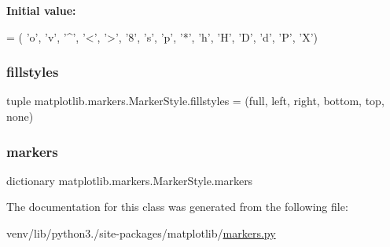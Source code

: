 {\bfseries Initial value\+:}
\begin{DoxyCode}
=  (
        \textcolor{stringliteral}{'o'}, \textcolor{stringliteral}{'v'}, \textcolor{stringliteral}{'^'}, \textcolor{stringliteral}{'<'}, \textcolor{stringliteral}{'>'}, \textcolor{stringliteral}{'8'}, \textcolor{stringliteral}{'s'}, \textcolor{stringliteral}{'p'}, \textcolor{stringliteral}{'*'}, \textcolor{stringliteral}{'h'}, \textcolor{stringliteral}{'H'}, \textcolor{stringliteral}{'D'}, \textcolor{stringliteral}{'d'},
        \textcolor{stringliteral}{'P'}, \textcolor{stringliteral}{'X'})
\end{DoxyCode}
\mbox{\label{classmatplotlib_1_1markers_1_1MarkerStyle_afdd2d6b5d2416a69e548989c2b518da4}} 
\subsubsection{\texorpdfstring{fillstyles}{fillstyles}}
{\footnotesize\ttfamily tuple matplotlib.\+markers.\+Marker\+Style.\+fillstyles = (\textquotesingle{}full\textquotesingle{}, \textquotesingle{}left\textquotesingle{}, \textquotesingle{}right\textquotesingle{}, \textquotesingle{}bottom\textquotesingle{}, \textquotesingle{}top\textquotesingle{}, \textquotesingle{}none\textquotesingle{})\hspace{0.3cm}{\ttfamily [static]}}

\mbox{\label{classmatplotlib_1_1markers_1_1MarkerStyle_a0ddfb9c88144670b3551f8b36c07fab1}} 
\subsubsection{\texorpdfstring{markers}{markers}}
{\footnotesize\ttfamily dictionary matplotlib.\+markers.\+Marker\+Style.\+markers\hspace{0.3cm}{\ttfamily [static]}}



The documentation for this class was generated from the following file\+:\begin{DoxyCompactItemize}
\item 
venv/lib/python3./site-\/packages/matplotlib/\hyperlink{matplotlib_2markers_8py}{markers.\+py}\end{DoxyCompactItemize}
